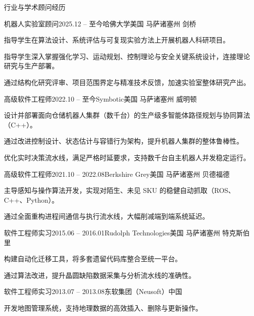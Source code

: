 \documentclass{resume}
\begin{document}
\begin{rSection}{行业与学术顾问经历}

\begin{rSubsection}{机器人实验室顾问}{2025.12 -- 至今}{哈佛大学}{美国 马萨诸塞州 剑桥}
\item 指导学生在算法设计、系统评估与可复现实验方法上开展机器人科研项目。
\item 指导学生深入掌握强化学习、运动规划、控制理论与安全关键系统设计，连接理论研究与生产部署。
\item 通过结构化研究评审、项目范围界定与精准技术反馈，加速实验室整体研究产出。
\end{rSubsection}

\begin{rSubsection}{高级软件工程师}{2022.10 -- 至今}{Symbotic}{美国 马萨诸塞州 威明顿}
\item 设计并部署面向仓储机器人集群（数千台）的生产级多智能体路径规划与协同算法（C++）。
\item 通过改进控制设计、状态估计与容错行为架构，提升机器人集群的整体鲁棒性。
\item 优化实时决策流水线，满足严格时延要求，支持数千台自主机器人并发稳定运行。
\end{rSubsection}

\begin{rSubsection}{高级软件工程师}{2021.10 -- 2022.08}{Berkshire Grey}{美国 马萨诸塞州 贝德福德}
\item 主导感知与操作算法开发，实现对陌生、未见 SKU 的稳健自动抓取（ROS、C++、Python）。
\item 通过全面重构进程间通信与执行流水线，大幅削减端到端系统延迟。
\end{rSubsection}

\begin{rSubsection}{软件工程师实习}{2015.06 -- 2016.01}{Rudolph Technologies}{美国 马萨诸塞州 特克斯伯里}
\item 构建自动化迁移工具，将多套遗留代码库整合至统一平台。
\item 通过算法改进，提升晶圆缺陷数据采集与分析流水线的准确性。
\end{rSubsection}

\begin{rSubsection}{软件工程师实习}{2013.07 -- 2013.08}{东软集团（Neusoft）}{中国}
\item 开发地图管理系统，支持地理数据的高效插入、删除与更新操作。
\end{rSubsection}

\end{rSection}
\end{document}

